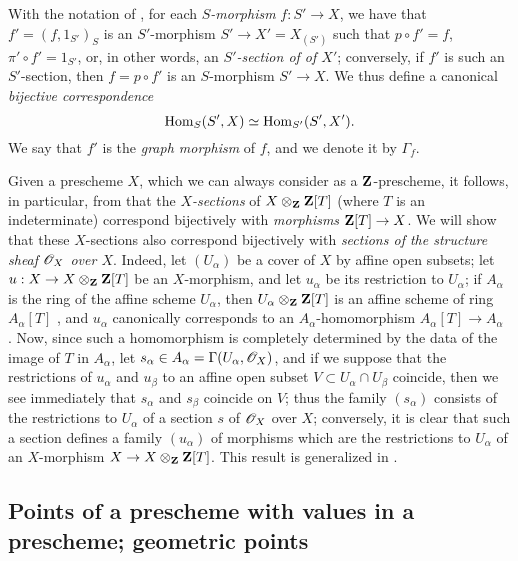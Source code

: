 \begin{env}[3.3.14]
\label{I.3.3.14}
With the notation of , for each \emph{$S$-morphism}
$f:S'\to X$, we have that $f'=(f,1_{S'})_S$ is an $S'$-morphism $S'\to X'=X_{(S')}$ such that
$p\circ f'=f$, $\pi'\circ f'=1_{S'}$, or, in other words, an \emph{$S'$-section of
of $X'$}; conversely, if $f'$ is such an $S'$-section, then $f=p\circ f'$ is an
$S$-morphism $S'\to X$. We thus define a canonical
\emph{bijective correspondence}
\[
  \operatorname{Hom}_S(S',X)\simeq\operatorname{Hom}_{S'}(S',X').
\]
We say that $f'$ is the \emph{graph morphism} of $f$, and we denote it by
$\Gamma_f$.
\end{env}

\begin{env}[3.3.15]
\label{I.3.3.15}
Given a prescheme $X$, which we can always consider as a $\mathbf{Z}$-prescheme,
it follows, in particular, from  that the \emph{$X$-sections} of
$X\otimes_\mathbf{Z}\mathbf{Z}[T]$ (where $T$ is an indeterminate)
correspond bijectively with \emph{morphisms} $\bb{Z}[T]\to X$. We will show that these
$X$-sections also correspond bijectively with \emph{sections of the structure
sheaf $\mathscr{O}_X$ over $X$}. Indeed, let $(U_\alpha)$ be a cover of $X$ by
affine open subsets; let $u:X\to X\otimes_\bb{Z}\bb{Z}[T]$ be an $X$-morphism, and let
$u_\alpha$ be its restriction to $U_\alpha$; if $A_\alpha$ is the ring of the
affine scheme $U_\alpha$, then $U_\alpha\otimes_\mathbf{Z}\mathbf{Z}[T]$ is an affine
scheme of ring $A_\alpha[T]$ , and $u_\alpha$ canonically
corresponds to an $A_\alpha$-homomorphism $A_\alpha[T]\to A_\alpha$
. Now, since such a homomorphism is completely determined by the
data of the image of $T$ in $A_\alpha$, let
$s_\alpha\in A_\alpha=\Gamma(U_\alpha,\mathscr{O}_X)$, and if we suppose that the
restrictions of $u_\alpha$ and $u_\beta$ to an affine open subset
$V\subset U_\alpha\cap U_\beta$ coincide, then we see immediately that
$s_\alpha$ and $s_\beta$ coincide on $V$; thus the family $(s_\alpha)$ consists
of the restrictions to $U_\alpha$ of a section $s$ of $\mathscr{O}_X$ over $X$;
conversely, it is clear that such a section defines a family $(u_\alpha)$ of
morphisms which are the restrictions to $U_\alpha$ of an $X$-morphism
$X\to X\otimes_\bb{Z}\bb{Z}[T]$. This result is generalized in
.
\end{env}

\subsection{Points of a prescheme with values in a prescheme; geometric points}
\label{subsection:I.3.4}

